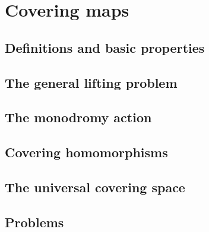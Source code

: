 \chapter{Covering maps}
\section{Definitions and basic properties}
\section{The general lifting problem}
\section{The monodromy action}
\section{Covering homomorphisms}
\section{The universal covering space}
\section{Problems}


